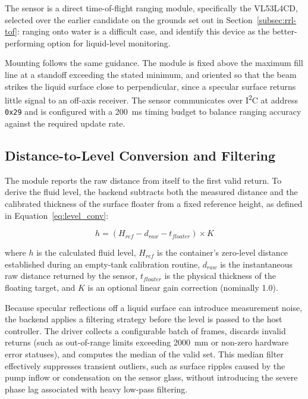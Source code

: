 The sensor is a direct time-of-flight ranging module, specifically the VL53L4CD, selected over the earlier candidate on the grounds set out in Section~\ref{subsec:rrl-tof}: ranging onto water is a difficult case, and \citet{st2022tn1450} identify this device as the better-performing option for liquid-level monitoring.

Mounting follows the same guidance. The module is fixed above the maximum fill line at a standoff exceeding the stated minimum, and oriented so that the beam strikes the liquid surface close to perpendicular, since a specular surface returns little signal to an off-axis receiver. The sensor communicates over I\textsuperscript{2}C at address \texttt{0x29} and is configured with a 200~ms timing budget to balance ranging accuracy against the required update rate.


\subsection{Distance-to-Level Conversion and Filtering}
\label{subsec:proc-tof-conv}

The module reports the raw distance from itself to the first valid return. To derive the fluid level, the backend subtracts both the measured distance and the calibrated thickness of the surface floater from a fixed reference height, as defined in Equation~\ref{eq:level_conv}:

\begin{equation}
    h = (H_{ref} - d_{raw} - t_{floater}) \times K
    \label{eq:level_conv}
\end{equation}

where $h$ is the calculated fluid level, $H_{ref}$ is the container's zero-level distance established during an empty-tank calibration routine, $d_{raw}$ is the instantaneous raw distance returned by the sensor, $t_{floater}$ is the physical thickness of the floating target, and $K$ is an optional linear gain correction (nominally 1.0). 

Because specular reflections off a liquid surface can introduce measurement noise, the backend applies a filtering strategy before the level is passed to the host controller. The driver collects a configurable batch of frames, discards invalid returns (such as out-of-range limits exceeding 2000~mm or non-zero hardware error statuses), and computes the median of the valid set. This median filter effectively suppresses transient outliers, such as surface ripples caused by the pump inflow or condensation on the sensor glass, without introducing the severe phase lag associated with heavy low-pass filtering. 

